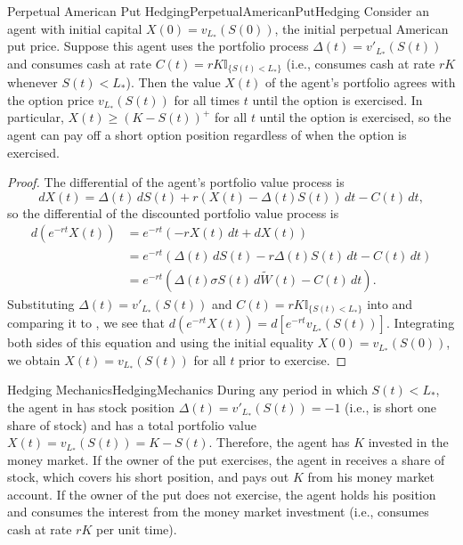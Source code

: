 \begin{cor}{Perpetual American Put Hedging}{PerpetualAmericanPutHedging}
	Consider an agent with initial capital $X(0) = v_{L_*}(S(0))$, the initial perpetual American put price. Suppose this agent uses the portfolio process $\Delta(t) = v'_{L_*}(S(t))$ and consumes cash at rate $C(t) = rK\mathbb{I}_{\{S(t)<L_*\}}$ (i.e., consumes cash at rate $rK$ whenever $S(t) < L_*$). Then the value $X(t)$ of the agent's portfolio agrees with the option price $v_{L_*}(S(t))$ for all times $t$ until the option is exercised. In particular, $X(t) \ge (K - S(t))^+$ for all $t$ until the option is exercised, so the agent can pay off a short option position regardless of when the option is exercised.
\end{cor}

\begin{proof}
	The differential of the agent's portfolio value process is
	\[
		dX(t) = \Delta(t) \, dS(t) + r(X(t) - \Delta(t)S(t)) \, dt - C(t) \, dt,
	\]
	so the differential of the discounted portfolio value process is
	\begin{align}
		d(e^{-rt}X(t)) & = e^{-rt}(-rX(t) \, dt + dX(t)) \nonumber                                                                  \\
		               & = e^{-rt}(\Delta(t) \, dS(t) - r\Delta(t)S(t) \, dt - C(t) \, dt) \nonumber                                \\
		               & = e^{-rt}(\Delta(t)\sigma S(t) \, d\widetilde{W}(t) - C(t) \, dt). \label{DiscountedPortfolioDifferential}
	\end{align}
	Substituting $\Delta(t) = v'_{L_*}(S(t))$ and $C(t) = rK\mathbb{I}_{\{S(t)<L_*\}}$ into  and comparing it to , we see that $d(e^{-rt}X(t)) = d[e^{-rt}v_{L_*}(S(t))]$. Integrating both sides of this equation and using the initial equality $X(0) = v_{L_*}(S(0))$, we obtain $X(t) = v_{L_*}(S(t))$ for all $t$ prior to exercise.
\end{proof}

\begin{xtip}{Hedging Mechanics}{HedgingMechanics}
	During any period in which $S(t) < L_*$, the agent in  has stock position $\Delta(t) = v'_{L_*}(S(t)) = -1$ (i.e., is short one share of stock) and has a total portfolio value $X(t) = v_{L_*}(S(t)) = K - S(t)$. Therefore, the agent has $K$ invested in the money market. If the owner of the put exercises, the agent in  receives a share of stock, which covers his short position, and pays out $K$ from his money market account. If the owner of the put does not exercise, the agent holds his position and consumes the interest from the money market investment (i.e., consumes cash at rate $rK$ per unit time).
\end{xtip}

